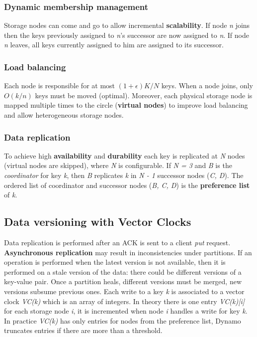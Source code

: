 		\subsubsection{Dynamic membership management}
		Storage nodes can come and go to allow incremental \textbf{scalability}.\newline
		If node \textit{n} joins then the keys previously assigned to \textit{n}'s successor are now assigned to \textit{n}. If node \textit{n} leaves, all keys currently assigned to him are assigned to its successor.
		\subsubsection{Load balancing}
		Each node is responsible for at most $(1 + \epsilon) K / N$ keys. When a node joins, only $O(k/n)$ keys must be moved (optimal).\newline
		Moreover, each physical storage node is mapped multiple times to the circle (\textbf{virtual nodes}) to improve load balancing and allow heterogeneous storage nodes.
		\subsubsection{Data replication}
		To achieve high \textbf{availability} and \textbf{durability} each key is replicated at \textit{N} nodes (virtual nodes are skipped), where \textit{N} is configurable.\newline
		If \textit{N = 3} and \textit{B} is the \textit{coordinator} for key \textit{k}, then \textit{B} replicates \textit{k} in \textit{N - 1} successor nodes (\textit{C, D}). The ordered list of coordinator and successor nodes (\textit{B, C, D}) is the \textbf{preference list} of \textit{k}.
	\subsection{Data versioning with Vector Clocks}
	Data replication is performed after an ACK is sent to a client \textit{put} request. \textbf{Asynchronous replication} may result in inconsistencies under partitions.\newline
	If an operation is performed when the latest version is not available, then it is performed on a stale version of the data: there could be different versions of a key-value pair.\newline
	Once a partition heals, different versions must be merged, new versions subsume previous ones.\newline
	\newline
	Each write to a key \textit{k} is associated to a vector clock \textit{VC(k)} which is an array of integers. In theory there is one entry \textit{VC(k)[i]} for each storage node \textit{i}, it is incremented when node \textit{i} handles a write for key \textit{k}.\newline
	In practice \textit{VC(k)} has only entries for nodes from the preference list, Dynamo truncates entries if there are more than a threshold.
